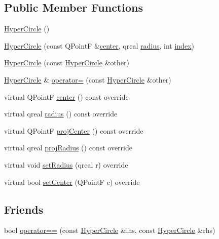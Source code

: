 \subsection*{Public Member Functions}
\begin{DoxyCompactItemize}
\item 
\hyperlink{class_circles_1_1_packing_1_1_hyper_circle_a72823d6e1e4bd622760a169a909503cb}{Hyper\+Circle} ()
\item 
\hyperlink{class_circles_1_1_packing_1_1_hyper_circle_a5a129ad0ef97c5b49540fef7d41af62d}{Hyper\+Circle} (const Q\+Point\+F \&\hyperlink{class_circles_1_1_packing_1_1_hyper_circle_a51297723cfb8adac038a706dabbbb1e7}{center}, qreal \hyperlink{class_circles_1_1_packing_1_1_hyper_circle_a6d841473a2de1967aea00933f31400ed}{radius}, int \hyperlink{class_circles_1_1_packing_1_1_circle_a426d2e69ceadbbf0d119fd117102a8a9}{index})
\item 
\hyperlink{class_circles_1_1_packing_1_1_hyper_circle_a7a6d5562301bd8a3c2eced964c964706}{Hyper\+Circle} (const \hyperlink{class_circles_1_1_packing_1_1_hyper_circle}{Hyper\+Circle} \&other)
\item 
\hyperlink{class_circles_1_1_packing_1_1_hyper_circle}{Hyper\+Circle} \& \hyperlink{class_circles_1_1_packing_1_1_hyper_circle_a3c819c695e95ea5f1dfa694513d1d093}{operator=} (const \hyperlink{class_circles_1_1_packing_1_1_hyper_circle}{Hyper\+Circle} \&other)
\item 
virtual Q\+Point\+F \hyperlink{class_circles_1_1_packing_1_1_hyper_circle_a51297723cfb8adac038a706dabbbb1e7}{center} () const  override
\item 
virtual qreal \hyperlink{class_circles_1_1_packing_1_1_hyper_circle_a6d841473a2de1967aea00933f31400ed}{radius} () const  override
\item 
virtual Q\+Point\+F \hyperlink{class_circles_1_1_packing_1_1_hyper_circle_a4a00caa714bc479d2b7d777c7cf41b19}{proj\+Center} () const  override
\item 
virtual qreal \hyperlink{class_circles_1_1_packing_1_1_hyper_circle_aee965a2f67ebf52e9cf88b2eb6f53b9f}{proj\+Radius} () const  override
\item 
virtual void \hyperlink{class_circles_1_1_packing_1_1_hyper_circle_a615257ea4d789aae5641fafca8c49047}{set\+Radius} (qreal r) override
\item 
virtual bool \hyperlink{class_circles_1_1_packing_1_1_hyper_circle_a5c4e09db77fee96d649d3faba1ee0a76}{set\+Center} (Q\+Point\+F c) override
\end{DoxyCompactItemize}
\subsection*{Friends}
\begin{DoxyCompactItemize}
\item 
bool \hyperlink{class_circles_1_1_packing_1_1_hyper_circle_ab72fdf6d06653137ab83406cb05e8f61}{operator==} (const \hyperlink{class_circles_1_1_packing_1_1_hyper_circle}{Hyper\+Circle} \&lhs, const \hyperlink{class_circles_1_1_packing_1_1_hyper_circle}{Hyper\+Circle} \&rhs)
\end{DoxyCompactItemize}

